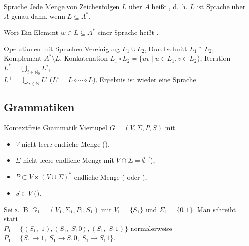 \begin{Def}{Sprache}
    Jede Menge von Zeichenfolgen $L$ über $A$ heißt
    , d.~h. $L$ ist Sprache über $A$
    genau dann, wenn $L \subseteq A^\ast$.
\end{Def}

\begin{Def}{Wort}
    Ein Element $w \in L \subseteq A^\ast$ einer Sprache heißt .
\end{Def}

\begin{Def}{Operationen mit Sprachen}
    Vereinigung $L_1 \cup L_2$, Durchschnitt $L_1 \cap L_2$, \\
    Komplement $A^\ast \setminus L$,
    Konkatenation $L_1 \circ L_2 = \{uv \;|\;u \in L_1, v \in L_2\}$,
    Iteration $L^\ast = \bigcup_{i \in \mathbb{N}_0} L^i$, \\
    $L^+ = \bigcup_{i \in \mathbb{N}} L^i$ ($L^i = L \circ \cdots \circ L$),
    Ergebnis ist wieder eine Sprache
\end{Def}

\subsection{%
    Grammatiken%
}

\begin{Def}{Kontextfreie Grammatik}
    Viertupel $G = (V, \Sigma, P, S)$ mit
    \begin{itemize}
        \item $V$ nicht-leere endliche Menge
        (),

        \item $\Sigma$ nicht-leere endliche Menge mit
        $V \cap \Sigma = \emptyset$ (),

        \item $P \subset V \times (V \cup \Sigma)^\ast$ endliche Menge
        ( oder ),

        \item $S \in V$ ().
    \end{itemize}

    Sei z.~B. $G_1 = (V_1, \Sigma_1, P_1, S_1)$ mit $V_1 = \{S_1\}$ und
    $\Sigma_1 = \{0, 1\}$. Man schreibt statt \\
    $P_1 = \{(S_1,\; 1), (S_1,\; S_{1}0), (S_1,\; S_{1}1)\}$ normalerweise
    $P_1 = \{S_1 \rightarrow 1,\; S_1 \rightarrow S_{1}0,\;
    S_1 \rightarrow S_{1}1\}$.
\end{Def}

